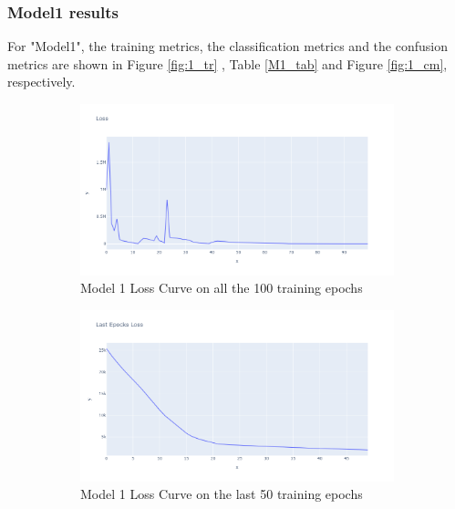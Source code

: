 \subsubsection{Model1 results}
For "Model1", the training metrics, the classification metrics and the confusion metrics are shown in Figure \ref{fig:1_tr} , Table \ref{M1_tab} and Figure \ref{fig:1_cm}, respectively.\\
\begin{figure}[H]%
    \centering
    \begin{subfigure}{0.45\textwidth}
        \centering
        \includegraphics[width=\linewidth]{figures/ev/1_tloss.png}
        \caption{Model 1 Loss Curve on all the 100 training epochs}
    \label{fig:1_tloss}
    \end{subfigure}
    \begin{subfigure}{0.45\textwidth}
        \centering
         \includegraphics[width=\linewidth]{figures/ev/1_ploss.png}
         \caption{Model 1 Loss Curve on the last 50 training epochs}
    \label{fig:1_ploss}
    \end{subfigure}
    \begin{subfigure}{0.45\textwidth}

\end{subfigure}
\end{figure}
